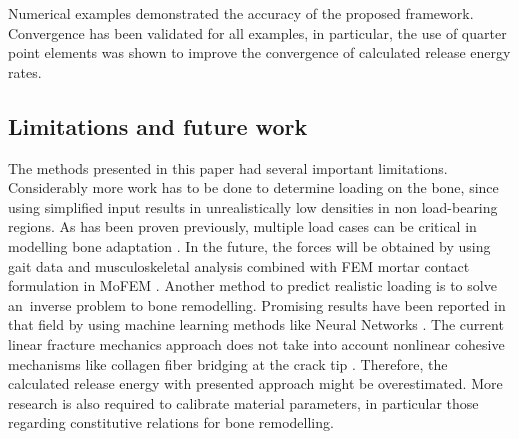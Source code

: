 \documentclass[11pt]{ACMEarticle}
\numberwithin{equation}{section}
\begin{document}
Numerical examples demonstrated the accuracy of the proposed framework. Convergence has been validated for all examples, in particular, the use of quarter point elements was shown to improve the convergence of calculated release energy rates. 
\subsection{Limitations and future work}
The methods presented in this paper had several important limitations. Considerably more work has to be done to determine loading on the bone, since using simplified input results in unrealistically low densities in non load-bearing regions. As has been proven previously, multiple load cases can be critical in modelling bone adaptation \citep{geraldes2016consideration}. In the future, the forces will be obtained by using gait data and musculoskeletal analysis \citep{Delp2007} combined with FEM mortar contact formulation in MoFEM \citep{athanasiadis2018mortar}. Another method to predict realistic loading is to solve an~inverse problem to bone remodelling. Promising results have been reported in that field by using machine learning methods like Neural Networks \citep{campoli2012computational}. The current linear fracture mechanics approach does not take into account nonlinear cohesive mechanisms like collagen fiber bridging at the crack tip \citep{yang2006fracture}. Therefore, the calculated release energy with presented approach might be overestimated. More research is also required to calibrate material parameters, in particular those regarding constitutive relations for bone remodelling. 





\end{document}
